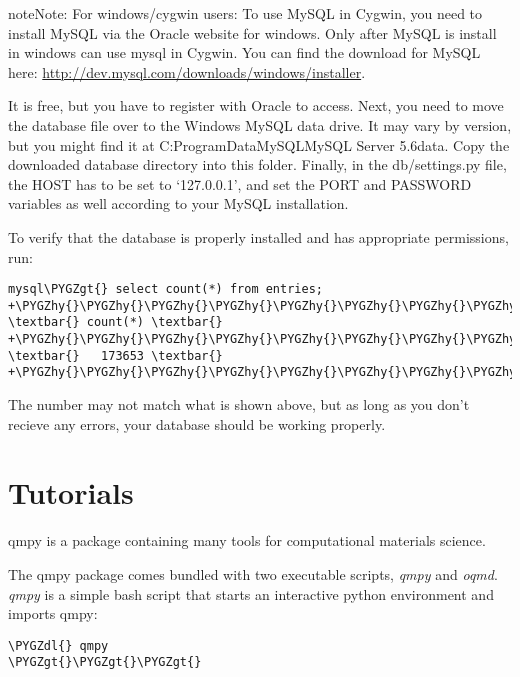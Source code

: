 \documentclass[letterpaper,10pt,english]{sphinxmanual}
\def\PYGZgt{\char`\>}
\def\PYGZdl{\char`\$}
\def\PYGZhy{\char`\-}
\begin{document}
\begin{notice}{note}{Note:}
For windows/cygwin users:
To use MySQL in Cygwin, you need to install MySQL via the Oracle website for
windows. Only after MySQL is install in windows can use mysql in Cygwin. You
can find the download for MySQL here:
\href{http://dev.mysql.com/downloads/windows/installer}{http://dev.mysql.com/downloads/windows/installer}.

It is free, but you have to register with Oracle to access. Next, you need to
move the database file over to the Windows MySQL data drive. It may vary by
version, but you might find it at C:ProgramDataMySQLMySQL Server 5.6data.
Copy the downloaded database directory into this folder. Finally, in the
db/settings.py file, the HOST has to be set to ‘127.0.0.1’, and set the PORT
and PASSWORD variables as well according to your MySQL installation.
\end{notice}

To verify that the database is properly installed and has appropriate
permissions, run:

\begin{Verbatim}[commandchars=\\\{\}]
mysql\PYGZgt{} select count(*) from entries;
+\PYGZhy{}\PYGZhy{}\PYGZhy{}\PYGZhy{}\PYGZhy{}\PYGZhy{}\PYGZhy{}\PYGZhy{}\PYGZhy{}\PYGZhy{}+
\textbar{} count(*) \textbar{}
+\PYGZhy{}\PYGZhy{}\PYGZhy{}\PYGZhy{}\PYGZhy{}\PYGZhy{}\PYGZhy{}\PYGZhy{}\PYGZhy{}\PYGZhy{}+
\textbar{}   173653 \textbar{}
+\PYGZhy{}\PYGZhy{}\PYGZhy{}\PYGZhy{}\PYGZhy{}\PYGZhy{}\PYGZhy{}\PYGZhy{}\PYGZhy{}\PYGZhy{}+
\end{Verbatim}

The number may not match what is shown above, but as long as you don't recieve
any errors, your database should be working properly.


\chapter{Tutorials}
\label{tutorials:tutorials}\label{tutorials::doc}\label{tutorials:module-qmpy}
qmpy is a package containing many tools for computational materials science.

The qmpy package comes bundled with two executable scripts, \emph{qmpy} and \emph{oqmd}.
\emph{qmpy} is a simple bash script that starts an interactive python
environment and imports qmpy:

\begin{Verbatim}[commandchars=\\\{\}]
\PYGZdl{} qmpy
\PYGZgt{}\PYGZgt{}\PYGZgt{}
\end{Verbatim}
\end{document}

